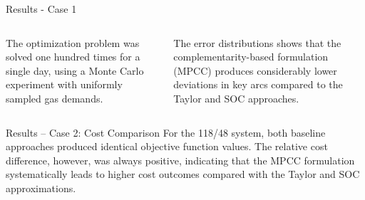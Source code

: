 \documentclass[hyperref={colorlinks,citecolor=blue,linkcolor=blue,urlcolor=blue}]{beamer}
\newlength\figureheight
\newlength\figurewidth
\begin{document}
\begin{frame}{Results - Case 1}
\scriptsize
\begin{columns}[t,onlytextwidth]
    \begin{column}{0.48\textwidth} 
        \justifying
        The optimization problem was solved one hundred times for a single day, using a Monte Carlo experiment with uniformly sampled gas demands.       
        \vspace{0.5em}
        \begin{figure}[!htb]
            \centering
            \setlength{}        
            \setlength{}
            
            \label{fig:blue_test_cost}
\end{figure}
    \end{column}
    
    \begin{column}{0.48\textwidth}
        \justifying
        The error distributions shows that the complementarity-based formulation (MPCC) produces considerably lower deviations in key arcs compared to the Taylor and SOC approaches.
        \vspace{2.5em}
        \begin{figure}[!htb]
            \centering
            \setlength{}        
            \setlength{}
            
            \label{fig:blue_test_boxplot}
        \end{figure}
    \end{column}
\end{columns}
\end{frame}



\begin{frame}{Results – Case 2: Cost Comparison}
\footnotesize
\justifying
For the 118/48 system, both baseline approaches produced identical objective 
function values. The relative cost difference, however, was always positive, 
indicating that the MPCC formulation systematically leads to higher cost 
outcomes compared with the Taylor and SOC approximations. 

\vspace{0.5em}
\begin{figure}[!htb]
    \centering
    \setlength{}        
    \setlength{}
    
    \label{fig:green_test_cost}
\end{figure}
\end{frame}
\end{document}
